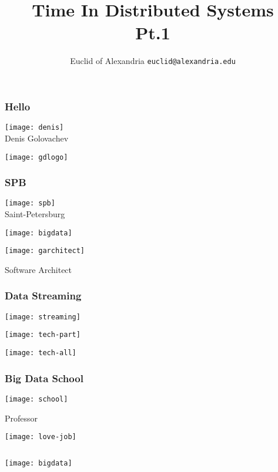 \documentclass[aspectratio=169, 15pt,usenames,dvipsnames]{beamer}
\title{Time In Distributed Systems\\Pt.1}
\author[Euclid]{Euclid of Alexandria \texttt{euclid@alexandria.edu}}
\begin{document}
{   
	\begin{titlePage} 
		\titlepage        
	\end{titlePage}
		
	\begin{gdblank}
		\frametitle{Hello}
		\centering\texttt{[image: denis]}
		\\Denis Golovachev		
	\end{gdblank} 
	\begin{gdblank}
		\centering\texttt{[image: gdlogo]}
	\end{gdblank}
	\begin{gdblank}
		\frametitle{SPB}
		\centering\texttt{[image: spb]}
		\\Saint-Petersburg
	\end{gdblank}
	\begin{gdblank}
		\centering\texttt{[image: bigdata]} 
	\end{gdblank}
	\begin{gdblank}
		\centering\texttt{[image: garchitect]} 
		\par\LARGE
		Software Architect
	\end{gdblank}
	\begin{gdblank}
		\frametitle{Data Streaming}
		\centering\texttt{[image: streaming]} 
	\end{gdblank}
	\begin{gdblank}
		\centering\texttt{[image: tech-part]} 
	\end{gdblank}
	\begin{gdblank}
		\centering\texttt{[image: tech-all]} 
	\end{gdblank}
	\begin{gdblank}
		\frametitle{Big Data School}
		\centering\texttt{[image: school]}
		\par\LARGE
		Professor 
	\end{gdblank}
	\begin{gdblank}
		\centering\texttt{[image: love-job]} 
	\end{gdblank}
	\begin{gdblank}
		\begin{columns}
			\begin{column}{0.5\textwidth}
				\centering\texttt{[image: bigdata]}
			\end{column}
			\pause 
			\begin{column}{0.5\textwidth}

\end{column}
\end{columns}
\end{gdblank}}
\end{document}
